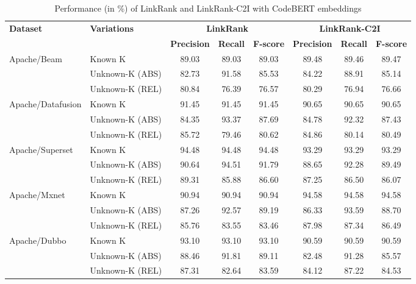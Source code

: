 \begin{table}[htbp]
\centering
\caption{Performance (in \%) of LinkRank and LinkRank-C2I with CodeBERT embeddings}
\renewcommand{\arraystretch}{1.3}
\label{rq1}
\begin{tabular}{@{}llcccccc@{}}
\toprule
\multirow{2}{*}{\textbf{Dataset}} & \multirow{2}{*}{\textbf{Variations}} & \multicolumn{3}{c}{\textbf{LinkRank}} & \multicolumn{3}{c}{\textbf{LinkRank-C2I}} \\
\cmidrule(lr){3-5} \cmidrule(lr){6-8}
 &  & \textbf{Precision} & \textbf{Recall} & \textbf{F-score} & \textbf{Precision} & \textbf{Recall} & \textbf{F-score} \\
\midrule

\multirow{3}{*}{Apache/Beam}
 & Known K           & 89.03 & 89.03 & 89.03 & 89.48 & 89.46 & 89.47 \\
 & Unknown-K (ABS)   & 82.73 & 91.58 & 85.53 & 84.22 & 88.91 & 85.14 \\
 & Unknown-K (REL)   & 80.84 & 76.39 & 76.57 & 80.29 & 76.94 & 76.66 \\
\midrule

\multirow{3}{*}{Apache/Datafusion}
 & Known K           & 91.45 & 91.45 & 91.45 & 90.65 & 90.65 & 90.65 \\
 & Unknown-K (ABS)   & 84.35 & 93.37 & 87.69 & 84.78 & 92.32 & 87.43 \\
 & Unknown-K (REL)   & 85.72 & 79.46 & 80.62 & 84.86 & 80.14 & 80.49 \\
\midrule

\multirow{3}{*}{Apache/Superset}
 & Known K           & 94.48 & 94.48 & 94.48 & 93.29 & 93.29 & 93.29 \\
 & Unknown-K (ABS)   & 90.64 & 94.51 & 91.79 & 88.65 & 92.28 & 89.49 \\
 & Unknown-K (REL)   & 89.31 & 85.88 & 86.60 & 87.25 & 86.50 & 86.07 \\
\midrule

\multirow{3}{*}{Apache/Mxnet}
 & Known K           & 90.94 & 90.94 & 90.94 & 94.58 & 94.58 & 94.58 \\
 & Unknown-K (ABS)   & 87.26 & 92.57 & 89.19 & 86.33 & 93.59 & 88.70 \\
 & Unknown-K (REL)   & 85.76 & 83.55 & 83.46 & 87.98 & 87.34 & 86.49 \\
\midrule

\multirow{3}{*}{Apache/Dubbo}
 & Known K           & 93.10 & 93.10 & 93.10 & 90.59 & 90.59 & 90.59 \\
 & Unknown-K (ABS)   & 88.46 & 91.81 & 89.11 & 82.48 & 91.28 & 85.57 \\
 & Unknown-K (REL)   & 87.31 & 82.64 & 83.59 & 84.12 & 87.22 & 84.53 \\
\midrule


\end{tabular}
\end{table}

